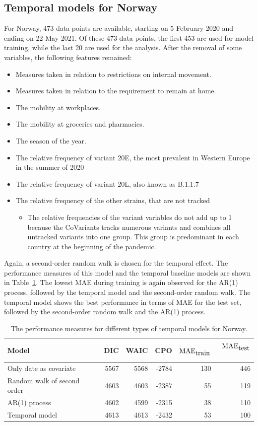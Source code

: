 \subsection{Temporal models for Norway}\label{sec:temp_nor}
For Norway, 473 data points are available, starting on 5 February 2020 and ending on 22 May 2021. Of these 473 data points, the first 453 are used for model training, while the last 20 are used for the analysis. After the removal of some variables, the following features remained:
\begin{itemize}
    \item Measures taken in relation to restrictions on internal movement.
    \item Measures taken in relation to the requirement to remain at home.
    \item The mobility at workplaces.
    \item The mobility at groceries and pharmacies.
    \item The season of the year.
    \item The relative frequency of variant 20E, the most prevalent in Western Europe in the summer of 2020
    \item The relative frequency of variant 20L, also known as B.1.1.7
    \item The relative frequency of the other strains, that are not tracked
    \begin{itemize}
        \item The relative frequencies of the variant variables do not add up to 1 because the CoVariants tracks numerous variants and combines all untracked variants into one group. This group is predominant in each country at the beginning of the pandemic.
    \end{itemize}
\end{itemize}
Again, a second-order random walk is chosen for the temporal effect. The performance measures of this model and the temporal baseline models are shown in Table~\ref{norway_temporal}. The lowest MAE during training is again observed for the AR(1) process, followed by the temporal model and the second-order random walk. The temporal model shows the best performance in terms of MAE for the test set, followed by the second-order random walk and the AR(1) process.
\begin{table}[H] 
\caption{The performance measures for different types of temporal models for Norway. \label{norway_temporal}}
\begin{tabular}{l r r r r r}
\toprule
\textbf{Model}	& \textbf{DIC}	& \textbf{WAIC} & \textbf{CPO} & \textbf{$\hbox{MAE}_{\hbox{train}}$} & \textbf{$\hbox{MAE}_{\hbox{test}}$}\ \\
\midrule
Only date as covariate & 5567 & 5568 & -2784 & 130 & 446 \\
Random walk of second order & 4603 & 4603 & -2387 & 55 & 119 \\
AR(1) process & 4602 & 4599 & -2315 & 38 & 110 \\
Temporal model &  4613 & 4613 & -2432 & 53 & 100 \\
\bottomrule
\end{tabular}
\end{table}
